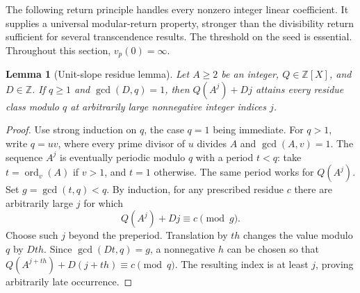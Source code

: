 \documentclass[11pt,a4paper]{article}
\newtheorem{lemma}[theorem]{Lemma}
\theoremstyle{definition}
\theoremstyle{remark}
\numberwithin{equation}{section}
\begin{document}
The following return principle handles every nonzero integer linear
coefficient. It supplies a universal modular-return property, stronger
than the divisibility return sufficient for several transcendence results.
The threshold on the seed is essential. Throughout this section,
$v_p(0)=\infty$.

\begin{lemma}[Unit-slope residue lemma]\label{sur:lem:clock-unit}
Let $A\ge2$ be an integer, $Q\in\mathbb Z[X]$, and $D\in\mathbb Z$.
If $q\ge1$ and $\gcd(D,q)=1$, then $Q(A^j)+Dj$ attains every residue
class modulo $q$ at arbitrarily large nonnegative integer indices $j$.
\end{lemma}
\begin{proof}
Use strong induction on $q$, the case $q=1$ being immediate. For $q>1$,
write $q=uv$, where every prime divisor of $u$ divides $A$ and
$\gcd(A,v)=1$. The sequence $A^j$ is eventually periodic modulo $q$
with a period $t<q$: take $t=\operatorname{ord}_v(A)$ if $v>1$, and
$t=1$ otherwise. The same period works for $Q(A^j)$. Set
$g=\gcd(t,q)<q$. By induction, for any prescribed residue $c$ there
are arbitrarily large $j$ for which
\[
 Q(A^j)+Dj\equiv c\pmod g.
\]
Choose such $j$ beyond the preperiod. Translation by $th$ changes the
value modulo $q$ by $Dth$. Since $\gcd(Dt,q)=g$, a nonnegative $h$
can be chosen so that $Q(A^{j+th})+D(j+th)\equiv c\pmod q$.
The resulting index is at least $j$, proving arbitrarily late occurrence.
\end{proof}
\end{document}
